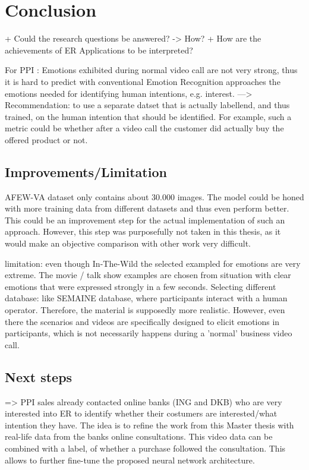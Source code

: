 
\chapter{Conclusion}
+ Could the research questions be answered? -> How?
+ How are the achievements of ER Applications to be interpreted?




For PPI :   Emotions exhibited during normal video call are not very strong, thus it is hard to predict with conventional Emotion Recognition approaches the emotions needed for identifying human intentions, e.g. interest.
---> Recommendation: to use a separate datset that is actually labellend, and thus trained, on the human intention that should be identified. For example, such a metric could be whether after a video call the customer did actually buy the offered product or not.

\section{Improvements/Limitation}
AFEW-VA dataset only contains about 30.000 images. The model could be honed with more training data from different datasets and thus even perform better. This could be an improvement step for the actual implementation of such an approach. However, this step was purposefully not taken in this thesis, as it would make an objective comparison with other work very difficult.

limitation: even though In-The-Wild
the selected exampled for emotions are very extreme. The movie / talk show examples are chosen from situation with clear emotions that were expressed strongly in a few seconds.
\newline\newling
Selecting different database: like SEMAINE database, where participants interact with a human operator. Therefore, the material is supposedly more realistic. However, even there the scenarios and videos are specifically designed to elicit emotions in participants, which is not necessarily happens during a 'normal' business video call.

\section{Next steps}
=> PPI sales already contacted online banks (ING and DKB) who are very interested into ER to identify whether their costumers are interested/what intention they have.
The idea is to refine the work from this Master thesis with real-life data from the banks online consultations. This video data can be combined with a label, of whether a purchase followed the consultation. This allows to further fine-tune the proposed neural network architecture.


